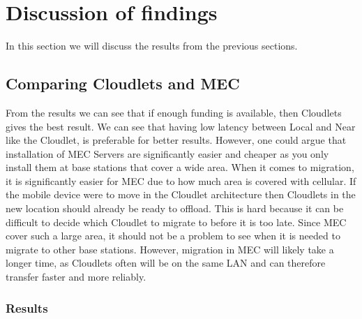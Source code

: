 



\section{Discussion of findings}
In this section we will discuss the results from the previous sections. 


\subsection{Comparing Cloudlets and MEC}
From the results we can see that if enough funding is available, then Cloudlets gives the best result. We can see that having low latency between Local and Near like the Cloudlet, is preferable for better results. However, one could argue that installation of MEC Servers are significantly easier and cheaper as you only install them at base stations that cover a wide area. When it comes to migration, it is significantly easier for MEC due to how much area is covered with cellular. If the mobile device were to move in the Cloudlet architecture then Cloudlets in the new location should already be ready to offload. This is hard because it can be difficult to decide which Cloudlet to migrate to before it is too late. Since MEC cover such a large area, it should not be a problem to see when it is needed to migrate to other base stations. However, migration in MEC will likely take a longer time, as Cloudlets often will be on the same LAN and can therefore transfer faster and more reliably.




\subsubsection{Results}

